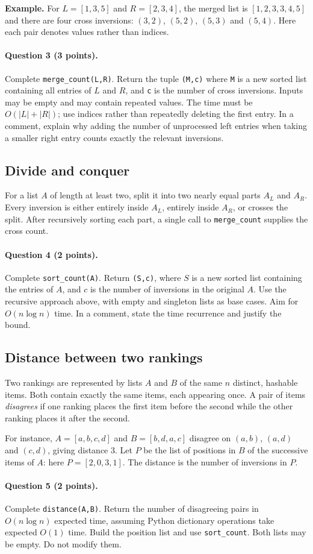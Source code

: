 \documentclass[11pt,a4paper]{article}
\newcommand{\q}[2]{\paragraph{Question #1 (#2 points).}}
\begin{document}
\textbf{Example.} For $L=[1,3,5]$ and $R=[2,3,4]$, the merged list is $[1,2,3,3,4,5]$ and there are four cross inversions: $(3,2)$, $(5,2)$, $(5,3)$ and $(5,4)$. Here each pair denotes values rather than indices.
\q{3}{3} Complete \texttt{merge\_count(L,R)}. Return the tuple \texttt{(M,c)} where \texttt{M} is a new sorted list containing all entries of $L$ and $R$, and \texttt{c} is the number of cross inversions. Inputs may be empty and may contain repeated values. The time must be $O(|L|+|R|)$; use indices rather than repeatedly deleting the first entry. In a comment, explain why adding the number of unprocessed left entries when taking a smaller right entry counts exactly the relevant inversions.
\newpage
\subsection*{Divide and conquer}
For a list $A$ of length at least two, split it into two nearly equal parts $A_L$ and $A_R$. Every inversion is either entirely inside $A_L$, entirely inside $A_R$, or crosses the split. After recursively sorting each part, a single call to \texttt{merge\_count} supplies the cross count.
\q{4}{2} Complete \texttt{sort\_count(A)}. Return \texttt{(S,c)}, where $S$ is a new sorted list containing the entries of $A$, and $c$ is the number of inversions in the original $A$. Use the recursive approach above, with empty and singleton lists as base cases. Aim for $O(n\log n)$ time. In a comment, state the time recurrence and justify the bound.

\subsection*{Distance between two rankings}
Two rankings are represented by lists $A$ and $B$ of the same $n$ distinct, hashable items. Both contain exactly the same items, each appearing once. A pair of items \emph{disagrees} if one ranking places the first item before the second while the other ranking places it after the second.

For instance, $A=[a,b,c,d]$ and $B=[b,d,a,c]$ disagree on $(a,b)$, $(a,d)$ and $(c,d)$, giving distance $3$. Let $P$ be the list of positions in $B$ of the successive items of $A$: here $P=[2,0,3,1]$. The distance is the number of inversions in $P$.
\q{5}{2} Complete \texttt{distance(A,B)}. Return the number of disagreeing pairs in $O(n\log n)$ expected time, assuming Python dictionary operations take expected $O(1)$ time. Build the position list and use \texttt{sort\_count}. Both lists may be empty. Do not modify them.
\newpage
\end{document}
